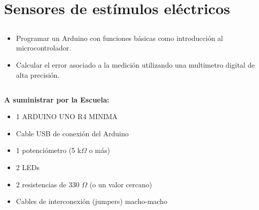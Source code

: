 \chapter{Sensores de estímulos eléctricos}
\section{\obj}
\capacidad
\begin{itemize}
    \item Programar un Arduino con funciones básicas como introducción al microcontrolador.
    \item Calcular el error asociado a la medición utilizando una multimetro digital de alta precisión.
\end{itemize}

\section{\mat}
\textbf{A suministrar por la Escuela:}
\begin{itemize}
    \item 1 ARDUINO UNO R4 MINIMA
    \item Cable USB de conexión del Arduino
    \item 1 potenciómetro (5 k$\Omega$ o más)
    \item 2 LEDs
    \item 2 resistencias de 330 $\Omega$ (o un valor cercano)
    \item Cables de interconexión (jumpers) macho-macho
\end{itemize}

